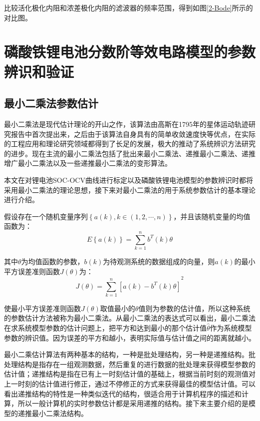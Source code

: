 比较活化极化内阻和浓差极化内阻的滤波器的频率范围，得到如图\ref{2-Bode}所示的对比图。

\section{磷酸铁锂电池分数阶等效电路模型的参数辨识和验证}
\subsection{最小二乘法参数估计}
最小二乘法是现代估计理论的开山之作，该算法由高斯在1795年的星体运动轨迹研究报告中首次提出来，之后由于该算法自身具有的简单收敛速度快等优点，在实际的工程应用和理论研究领域都得到了长足的发展，极大的推动了系统辨识方法研究的进步。现在主流的最小二乘法包括了批出来最小二乘法、递推最小二乘法、递推增广最小二乘法以及一些递推最小二乘法的变形算法。

本文在对锂电池SOC-OCV曲线进行标定以及磷酸铁锂电池模型的参数辨识时都将采用最小二乘法的理论思想，接下来对最小二乘法的用于系统参数估计的基本理论进行介绍。

假设存在一个随机变量序列$\left\{ a\left( k \right),k\in \left( 1,2,\cdots ,n \right) \right\}$，并且该随机变量的均值函数为：
\begin{equation}
E\left\{ a\left( k \right) \right\}=\sum\limits_{k=1}^{n}{{{b}^{T}}\left( k \right)\theta }
\end{equation}

其中$\theta $为均值函数的参数，$b\left( k \right)$为待观测系统的数据组成的向量，则$a\left( k \right)$的最小平方误差准则函数$J\left( \theta  \right)$为：
\begin{equation}
J\left( \theta  \right)={{\sum\limits_{k=1}^{n}{\left[ a(k)-{{b}^{T}}(k)\theta  \right]}}^{2}}
\end{equation}

使最小平方误差准则函数$J\left( \theta  \right)$取值最小的$\theta$值则为参数的估计值，所以这种系统的参数估计方法被称为最小二乘法。从最小二乘法的表达式可以看出，最小二乘法在求系统模型参数的估计问题上，把平方和达到最小的那个估计值$\hat{\theta }$作为系统模型参数的辨识值。因为误差的平方和越小，表明实际值与估计值之间的距离就越小。

最小二乘估计算法有两种基本的结构，一种是批处理结构，另一种是递推结构。批处理结构是指存在一组观测数据，然后重复的进行数据的批处理来获得模型参数的估计值；递推结构是指在已有上一时刻估计值的基础上，根据当前时刻的观测值对上一时刻的估计值进行修正，通过不停修正的方式来获得最佳的模型估计值。可以看出递推结构的特性是一种类似迭代的结构，很适合用于计算机程序的描述和计算，所以一般计算机的实时参数估计都是采用递推的结构。接下来主要介绍的是模型的递推最小二乘法结构。

